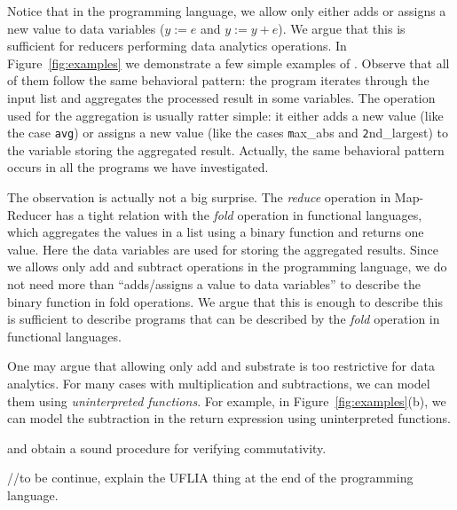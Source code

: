 \documentclass[runningheads,a4paper]{llncs}
\begin{document}
Notice that in the programming language, we allow only either adds or assigns a new value to data variables ($y := e$ and $y := y+e$). We argue that this is sufficient for reducers performing data analytics operations.
In Figure~\ref{fig:examples} we demonstrate a few simple examples of . Observe that all of them follow the same behavioral pattern: the program iterates through the input list and aggregates the processed result in some variables. The operation used for the aggregation is usually ratter simple: it either adds a new value (like the case \texttt{avg}) or assigns a new value (like the cases {\texttt max\_abs} and {\texttt 2nd\_largest}) to the variable storing the aggregated result. Actually, the same behavioral pattern occurs in all the programs we have investigated.

The observation is actually not a big surprise. The \emph{reduce} operation in Map-Reducer has a tight relation with the \emph{fold} operation in functional languages, which aggregates the values in a list using a binary function and returns one value. Here the data variables are used for storing the aggregated results. Since we allows only add and subtract operations in the programming language, we do not need more than ``adds/assigns a value to data variables'' to describe the binary function in fold operations. We argue that this is enough to describe this is sufficient to describe programs that can be described by the \emph{fold} operation in functional languages.

One may argue that allowing only add and substrate is too restrictive for data analytics. For many cases with multiplication and subtractions, we can model them using \emph{uninterpreted functions}. For example, in Figure~\ref{fig:examples}(b), we can model the subtraction in the return expression using uninterpreted functions.

 and obtain a sound procedure for verifying commutativity. 

//to be continue, explain the UFLIA thing at the end of the programming language.
\end{document}
